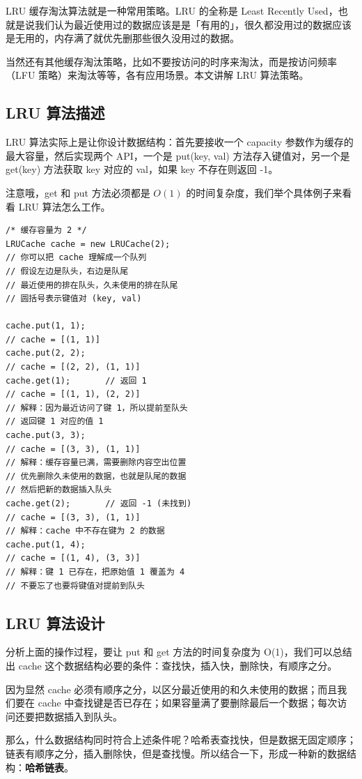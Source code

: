 \documentclass[12pt]{article}
\begin{document}
LRU 缓存淘汰算法就是一种常用策略。LRU 的全称是 Least Recently Used，也就是说我们认为最近使用过的数据应该是是「有用的」，很久都没用过的数据应该是无用的，内存满了就优先删那些很久没用过的数据。

当然还有其他缓存淘汰策略，比如不要按访问的时序来淘汰，而是按访问频率（LFU 策略）来淘汰等等，各有应用场景。本文讲解 LRU 算法策略。

\subsection{LRU 算法描述}
LRU 算法实际上是让你设计数据结构：首先要接收一个 capacity 参数作为缓存的最大容量，然后实现两个 API，一个是 put(key, val) 方法存入键值对，另一个是 get(key) 方法获取 key 对应的 val，如果 key 不存在则返回 -1。

注意哦，get 和 put 方法必须都是 $O(1)$ 的时间复杂度，我们举个具体例子来看看 LRU 算法怎么工作。
\begin{lstlisting}
/* 缓存容量为 2 */
LRUCache cache = new LRUCache(2);
// 你可以把 cache 理解成一个队列
// 假设左边是队头，右边是队尾
// 最近使用的排在队头，久未使用的排在队尾
// 圆括号表示键值对 (key, val)

cache.put(1, 1);
// cache = [(1, 1)]
cache.put(2, 2);
// cache = [(2, 2), (1, 1)]
cache.get(1);       // 返回 1
// cache = [(1, 1), (2, 2)]
// 解释：因为最近访问了键 1，所以提前至队头
// 返回键 1 对应的值 1
cache.put(3, 3);
// cache = [(3, 3), (1, 1)]
// 解释：缓存容量已满，需要删除内容空出位置
// 优先删除久未使用的数据，也就是队尾的数据
// 然后把新的数据插入队头
cache.get(2);       // 返回 -1 (未找到)
// cache = [(3, 3), (1, 1)]
// 解释：cache 中不存在键为 2 的数据
cache.put(1, 4);    
// cache = [(1, 4), (3, 3)]
// 解释：键 1 已存在，把原始值 1 覆盖为 4
// 不要忘了也要将键值对提前到队头
\end{lstlisting}

\subsection{LRU 算法设计}
分析上面的操作过程，要让 put 和 get 方法的时间复杂度为 O(1)，我们可以总结出 cache 这个数据结构必要的条件：查找快，插入快，删除快，有顺序之分。

因为显然 cache 必须有顺序之分，以区分最近使用的和久未使用的数据；而且我们要在 cache 中查找键是否已存在；如果容量满了要删除最后一个数据；每次访问还要把数据插入到队头。

那么，什么数据结构同时符合上述条件呢？哈希表查找快，但是数据无固定顺序；链表有顺序之分，插入删除快，但是查找慢。所以结合一下，形成一种新的数据结构：\textbf{哈希链表}。
\end{document}
